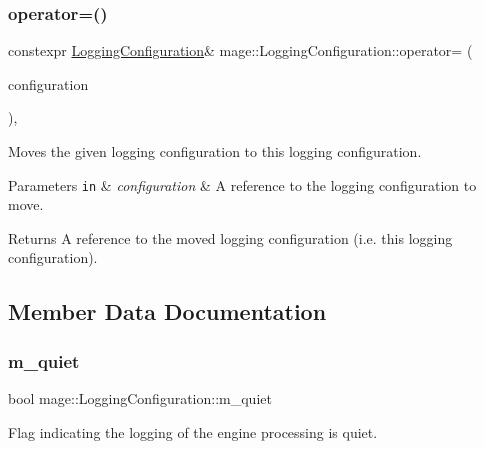 \subsubsection{\texorpdfstring{operator=()}{operator=()}\hspace{0.1cm}{\footnotesize\ttfamily [2/2]}}
{\footnotesize\ttfamily constexpr \mbox{\hyperlink{classmage_1_1_logging_configuration}{Logging\+Configuration}}\& mage\+::\+Logging\+Configuration\+::operator= (\begin{DoxyParamCaption}\item[{\mbox{\hyperlink{classmage_1_1_logging_configuration}{Logging\+Configuration}} \&\&}]{configuration }\end{DoxyParamCaption})\hspace{0.3cm}{\ttfamily [default]}, {\ttfamily [noexcept]}}

Moves the given logging configuration to this logging configuration.


\begin{DoxyParams}[1]{Parameters}
\mbox{\tt in}  & {\em configuration} & A reference to the logging configuration to move. \\
\hline
\end{DoxyParams}
\begin{DoxyReturn}{Returns}
A reference to the moved logging configuration (i.\+e. this logging configuration). 
\end{DoxyReturn}


\subsection{Member Data Documentation}
\mbox{\label{classmage_1_1_logging_configuration_a38f457d5db84d15e008841ca8653b47c}} 
\subsubsection{\texorpdfstring{m\+\_\+quiet}{m\_quiet}}
{\footnotesize\ttfamily bool mage\+::\+Logging\+Configuration\+::m\+\_\+quiet\hspace{0.3cm}{\ttfamily [private]}}

Flag indicating the logging of the engine processing is quiet. \mbox{\label{classmage_1_1_logging_configuration_a60f052c2bb702d8153188e93f00427ac}} 
